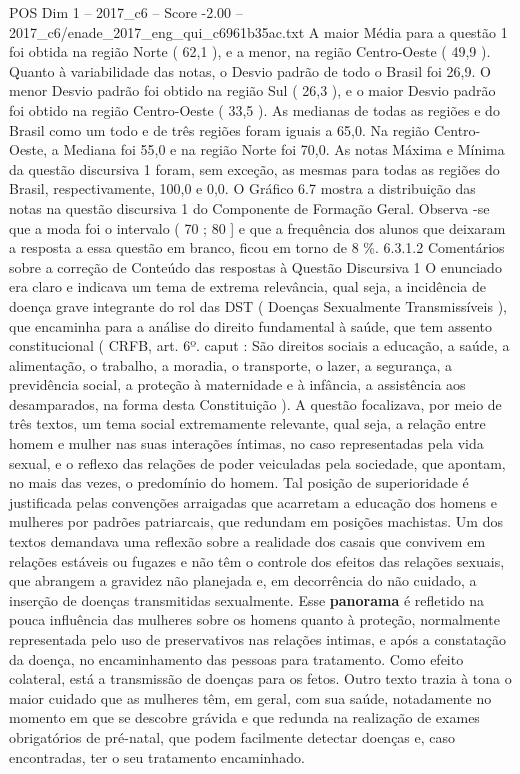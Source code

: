 \begin{textsample}{POS Dim 1 – 2017\_c6 – Score -2.00 – 2017\_c6/enade\_2017\_eng\_qui\_c6961b35ac.txt}
A maior Média para a questão 1 foi obtida na região Norte ( 62,1 ), e a menor, na região Centro-Oeste ( 49,9 ).
Quanto à variabilidade das notas, o Desvio padrão de todo o Brasil foi 26,9.
O menor Desvio padrão foi obtido na região Sul ( 26,3 ), e o maior Desvio padrão foi obtido na região Centro-Oeste ( 33,5 ).
As medianas de todas as regiões e do Brasil como um todo e de três regiões foram iguais a 65,0.
Na região Centro-Oeste, a Mediana foi 55,0 e na região Norte foi 70,0.
As notas Máxima e Mínima da questão discursiva 1 foram, sem exceção, as mesmas para todas as regiões do Brasil, respectivamente, 100,0 e 0,0.
O Gráfico 6.7 mostra a distribuição das notas na questão discursiva 1 do Componente de Formação Geral.
Observa -se que a moda foi o intervalo ( 70 ; 80 ] e que a frequência dos alunos que deixaram a resposta a essa questão em branco, ficou em torno de 8 \%. 6.3.1.2 Comentários sobre a correção de Conteúdo das respostas à Questão Discursiva 1 O enunciado era claro e indicava um tema de extrema relevância, qual seja, a incidência de doença grave integrante do rol das DST ( Doenças Sexualmente Transmissíveis ), que encaminha para a análise do direito fundamental à saúde, que tem assento constitucional ( CRFB, art. 6º. caput : São direitos sociais a educação, a saúde, a alimentação, o trabalho, a moradia, o transporte, o lazer, a segurança, a previdência social, a proteção à maternidade e à infância, a assistência aos desamparados, na forma desta Constituição ).
A questão focalizava, por meio de três textos, um tema social extremamente relevante, qual seja, a relação entre homem e mulher nas suas interações íntimas, no caso representadas pela vida sexual, e o reflexo das relações de poder veiculadas pela sociedade, que apontam, no mais das vezes, o predomínio do homem.
Tal posição de superioridade é justificada pelas convenções arraigadas que acarretam a educação dos homens e mulheres por padrões patriarcais, que redundam em posições machistas.
Um dos textos demandava uma reflexão sobre a realidade dos casais que convivem em relações estáveis ou fugazes e não têm o controle dos efeitos das relações sexuais, que abrangem a gravidez não planejada e, em decorrência do não cuidado, a inserção de doenças transmitidas sexualmente.
Esse \textbf{panorama} é refletido na pouca influência das mulheres sobre os homens quanto à proteção, normalmente representada pelo uso de preservativos nas relações intimas, e após a constatação da doença, no encaminhamento das pessoas para tratamento.
Como efeito colateral, está a transmissão de doenças para os fetos.
Outro texto trazia à tona o maior cuidado que as mulheres têm, em geral, com sua saúde, notadamente no momento em que se descobre grávida e que redunda na realização de exames obrigatórios de pré-natal, que podem facilmente detectar doenças e, caso encontradas, ter o seu tratamento encaminhado.

\end{textsample}
